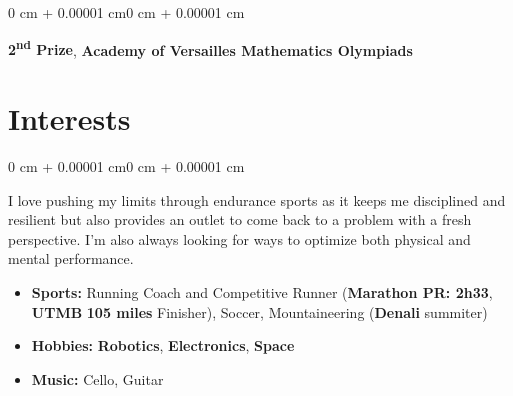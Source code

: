 \documentclass[10pt, letterpaper]{article}
\newenvironment{highlightsforbulletentries}{
    \begin{itemize}[
        topsep=0.10 cm,
        parsep=0.10 cm,
        partopsep=0pt,
        itemsep=0pt,
        leftmargin=1.5 cm
    ]
}{
    \end{itemize}
}
\newenvironment{onecolentry}{
    \begin{adjustwidth}{0 cm + 0.00001 cm}{0 cm + 0.00001 cm}
}{
    \end{adjustwidth}
}
\newenvironment{twocolentry}[2][]{
    \onecolentry
    \def\secondColumn{#2}
    \setcolumnwidth{\fill, 4.5 cm}
    \begin{paracol}{2}
}{
    \switchcolumn \raggedleft \secondColumn
    \end{paracol}
    \endonecolentry
}
\begin{document}
    \begin{twocolentry}{2008}
        \textbf{2\textsuperscript{nd} Prize}, \textbf{Academy of Versailles Mathematics Olympiads}
    \end{twocolentry}
    

    \section{Interests}
    \begin{onecolentry}
        I love pushing my limits through endurance sports as it keeps me disciplined and resilient but also provides an outlet to come back to a problem with a fresh perspective.  I'm also always looking for ways to optimize both physical and mental performance.
        \begin{highlightsforbulletentries}
            \item \textbf{Sports:} Running Coach and Competitive Runner (\textbf{Marathon PR: 2h33}, \textbf{UTMB} \textbf{105 miles} Finisher), Soccer, Mountaineering (\textbf{Denali} summiter)
            \item \textbf{Hobbies:} \textbf{Robotics}, \textbf{Electronics}, \textbf{Space}
            \item \textbf{Music:} Cello, Guitar
        \end{highlightsforbulletentries}
    \end{onecolentry}
\end{document}

